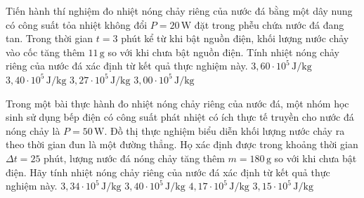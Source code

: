 \begin{ex}
Tiến hành thí nghiệm đo nhiệt nóng chảy riêng của nước đá bằng một dây nung có công suất tỏa nhiệt không đổi $P=20\,\mathrm{W}$ đặt trong phễu chứa nước đá đang tan. Trong thời gian $t=3$ phút kể từ khi bật nguồn điện, khối lượng nước chảy vào cốc tăng thêm $11\,\mathrm{g}$ so với khi chưa bật nguồn điện. Tính nhiệt nóng chảy riêng của nước đá xác định từ kết quả thực nghiệm này.
\choice
{$3,60\cdot 10^5\,\mathrm{J/kg}$}
{$3,40\cdot 10^5\,\mathrm{J/kg}$}
{\True $3,27\cdot 10^5\,\mathrm{J/kg}$}
{$3,00\cdot 10^5\,\mathrm{J/kg}$}
\end{ex}

\begin{ex}
Trong một bài thực hành đo nhiệt nóng chảy riêng của nước đá, một nhóm học sinh sử dụng bếp điện có công suất phát nhiệt có ích thực tế truyền cho nước đá nóng chảy là $P=50\,\mathrm{W}$. Đồ thị thực nghiệm biểu diễn khối lượng nước chảy ra theo thời gian đun là một đường thẳng. Họ xác định được trong khoảng thời gian $\Delta t=25$ phút, lượng nước đá nóng chảy tăng thêm $m=180\,\mathrm{g}$ so với khi chưa bật điện. Hãy tính nhiệt nóng chảy riêng của nước đá xác định từ kết quả thực nghiệm này.
\choice
{$3,34\cdot 10^5\,\mathrm{J/kg}$}
{$3,40\cdot 10^5\,\mathrm{J/kg}$}
{\True $4,17\cdot 10^5\,\mathrm{J/kg}$}
{$3,15\cdot 10^5\,\mathrm{J/kg}$}
\end{ex}

